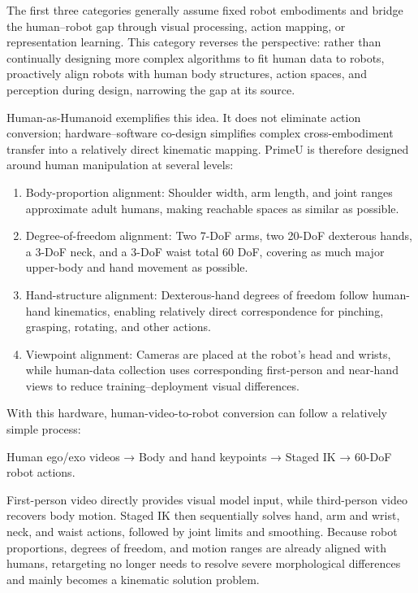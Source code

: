 The first three categories generally assume fixed robot embodiments and bridge the human--robot gap through visual processing, action mapping, or representation learning. This category reverses the perspective: rather than continually designing more complex algorithms to fit human data to robots, proactively align robots with human body structures, action spaces, and perception during design, narrowing the gap at its source.

Human-as-Humanoid exemplifies this idea. It does not eliminate action conversion; hardware--software co-design simplifies complex cross-embodiment transfer into a relatively direct kinematic mapping. PrimeU is therefore designed around human manipulation at several levels:

\begin{enumerate}
\def\labelenumi{\arabic{enumi}.}
\item
  Body-proportion alignment: Shoulder width, arm length, and joint ranges approximate adult humans, making reachable spaces as similar as possible.
\item
  Degree-of-freedom alignment: Two 7-DoF arms, two 20-DoF dexterous hands, a 3-DoF neck, and a 3-DoF waist total 60 DoF, covering as much major upper-body and hand movement as possible.
\item
  Hand-structure alignment: Dexterous-hand degrees of freedom follow human-hand kinematics, enabling relatively direct correspondence for pinching, grasping, rotating, and other actions.
\item
  Viewpoint alignment: Cameras are placed at the robot's head and wrists, while human-data collection uses corresponding first-person and near-hand views to reduce training--deployment visual differences.
\end{enumerate}

With this hardware, human-video-to-robot conversion can follow a relatively simple process:

Human ego/exo videos → Body and hand keypoints → Staged IK → 60-DoF robot actions.

First-person video directly provides visual model input, while third-person video recovers body motion. Staged IK then sequentially solves hand, arm and wrist, neck, and waist actions, followed by joint limits and smoothing. Because robot proportions, degrees of freedom, and motion ranges are already aligned with humans, retargeting no longer needs to resolve severe morphological differences and mainly becomes a kinematic solution problem.

